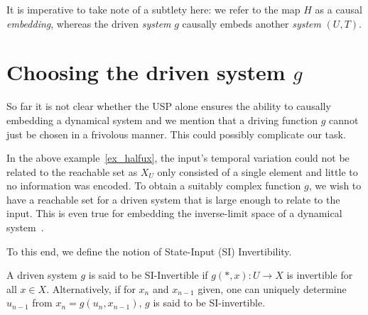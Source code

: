 It is imperative to take note of a subtlety here: we refer to the map $H$ as a causal \textit{embedding}, whereas the driven \textit{system} $g$ causally embeds another \emph{system} $(U,T)$.

\section{Choosing the driven system $g$}

So far it is not clear whether the USP alone ensures the ability to causally embedding a dynamical system and we mention that a driving function $g$ cannot just be chosen in a frivolous manner. This could possibly complicate our task. %





In the above example~\ref{ex_halfux}, the input's temporal variation could not be related to the reachable set as $X_U$ only consisted of a single element and little to no information was encoded.
To obtain a suitably complex function $g$, we wish to have a reachable set for a driven system  that is large enough to relate to the input. 
This is even true for embedding  the inverse-limit space of a dynamical system~\cite{manjunath2021universal}. 

 To this end, we define the notion of State-Input (SI) Invertibility.  

\begin{Definition}
  [\bf SI-Invertibility]\label{Dfn_SIinv}\rm
  A driven system $g$ is said to be SI-Invertible if ${g(*,x): U \to X}$ is invertible for all $x\in X$. Alternatively, if for  $x_n$ and $x_{n-1}$ given, one can uniquely determine $u_{n-1}$ from $x_n=g(u_n,x_{n-1})$, $g$ is said to be SI-invertible.
\end{Definition}

